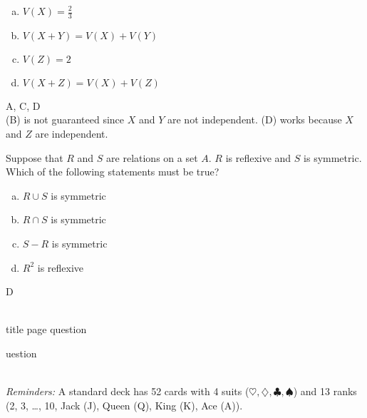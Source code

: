 \vspace{0.3in}
\begin{enumerate}[(a)]
	\item  $V(X) = \frac{2}{3}$
    
	\item  $V(X+Y) = V(X)+V(Y)$
    
	\item  $V(Z) = 2$
    
	\item  $V(X+Z) = V(X)+V(Z)$

\end{enumerate}
\begin{solution}

A, C, D
\\
(B) is not guaranteed since $X$ and $Y$ are not independent. (D) works because $X$ and $Z$ are independent.

\end{solution}


Suppose that $R$ and $S$ are relations on a set $A$. $R$ is reflexive and $S$ is symmetric. Which of the following statements must be true?

\begin{enumerate}[(a)]
	\item  $R \cup S$ is symmetric

	\item  $R \cap S$ is symmetric

	\item  $S - R$ is symmetric

	\item  $R^2$ is reflexive

\end{enumerate}
\begin{solution}

D

\end{solution}
\\
title page question
\begin{enumerate}[(a)]
\end{enumerate}
\begin{solution}
uestion

\end{solution}
\\
\textit{Reminders:} A standard deck has 52 cards with 4 suits ($\heartsuit, \diamondsuit, \clubsuit, \spadesuit$) and 13 ranks (2, 3, \dots, 10, Jack (J), Queen (Q), King (K), Ace (A)). \\

